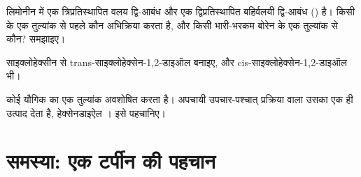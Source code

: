\begin{exercise}[$\star\star\star$]\label{exo:b2:alkene-redox:10}
लिमोनीन में एक त्रिप्रतिस्थापित वलय द्वि-आबंध और एक द्विप्रतिस्थापित बहिर्वलयी द्वि-आबंध
() है। किसी  के एक तुल्यांक से पहले कौन अभिक्रिया करता है, और
किसी भारी-भरकम बोरेन के एक तुल्यांक से कौन? समझाइए।
\end{exercise}

\begin{exercise}[$\star\star\star$]\label{exo:b2:alkene-redox:11}
साइक्लोहेक्सीन से trans-साइक्लोहेक्सेन-1,2-डाइऑल बनाइए, और cis-साइक्लोहेक्सेन-1,2-डाइऑल भी।
\end{exercise}

\begin{exercise}[$\star\star\star$]\label{exo:b2:alkene-redox:12}
कोई यौगिक   का एक तुल्यांक अवशोषित करता है। अपचायी उपचार-पश्चात् प्रक्रिया वाला उसका
 एक ही उत्पाद देता है, हेक्सेनडाइऐल । इसे पहचानिए।
\end{exercise}

\section{समस्या: एक टर्पीन की पहचान}

